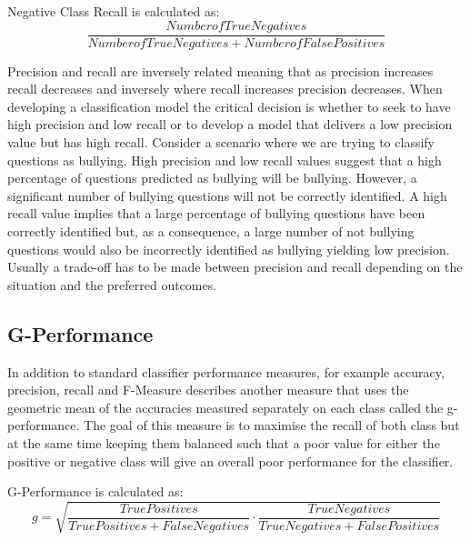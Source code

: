 Negative Class Recall is calculated as:
\begin{equation}
     \frac{Number of True Negatives}{Number of True Negatives + Number of False Positives}
\end{equation} 


Precision and recall are inversely related meaning that as precision increases recall decreases and inversely where recall increases precision decreases. When developing a classification model the critical decision is whether to seek to have high precision and low recall or to develop a model that delivers a low precision value but has high recall. Consider a scenario where we are trying to classify questions as bullying. High precision and low recall values suggest that a high percentage of questions predicted as bullying will be bullying. However, a significant number of bullying questions will not be correctly identified. A high recall value implies that a large percentage of bullying questions have been correctly identified but, as a consequence, a large number of not bullying questions would also be incorrectly identified as bullying yielding low precision. Usually a trade-off has to be made between precision and recall depending on the situation and the preferred outcomes.

\subsection{G-Performance}
In addition to standard classifier performance measures, for example accuracy, precision, recall and F-Measure \citeauthor{kubat_addressing_1997} \cite{kubat_addressing_1997} describes another measure that uses the geometric mean of the accuracies measured separately on each class called the g-performance. The goal of this measure is to maximise the recall of both class but at the same time keeping them balanced such that a poor value for either the positive or negative class will give an overall poor performance for the classifier.

G-Performance is calculated as:
\begin{equation}
     g =\sqrt{\frac{True Positives}{True Positives + False Negatives} \cdot \frac{True Negatives}{True Negatives + False Positives}}
\end{equation} 